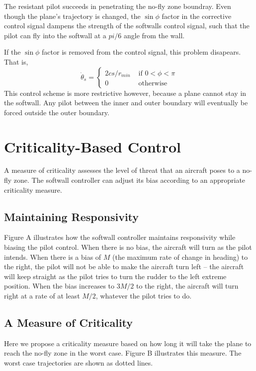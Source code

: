 \documentclass[11pt]{article}
\begin{document}
The resistant pilot succeeds in penetrating the no-fly zone boundray.  Even though the plane's trajectory is changed, the $\sin{\phi}$ factor in the corrective control signal dampens the strength of the softwalls control signal, such that the pilot can fly into the softwall at a  $pi/6$ angle from the wall.

If the $\sin{\phi}$ factor is removed from the control signal, this problem disapears.  That is,
\[
\dot{\theta}_s = \left \{
\begin{array}{ll}
2 c s/r_{min}& \mbox{ if } 0 < \phi < \pi\\
0 & \mbox{ otherwise}
\end{array}
\right .
\]
This control scheme is more restrictive however, because a plane cannot stay in the softwall.  Any pilot between the inner and outer boundary will eventually be forced outside the outer boundary.

\section{Criticality-Based Control}

A measure of criticality assesses the level of threat that an aircraft poses to
a no-fly zone. The softwall controller can adjust its bias according to an
appropriate criticality measure.

\subsection{Maintaining Responsivity}

Figure A illustrates how the softwall controller maintains responsivity while
biasing the pilot control. When there is no bias, the aircraft will turn as the
pilot intends. When there is a bias of $M$ (the maximum rate of change in
heading) to the right, the pilot will not be able to make the aircraft turn 
left -- the aircraft will keep straight as the pilot tries to turn the rudder
to the left extreme position. 
When the bias increases to $3M/2$ to the right, the aircraft will turn right at
a rate of at least $M/2$, whatever the pilot tries to do.

\subsection{A Measure of Criticality}

Here we propose a criticality measure based on how long it will take the plane
to reach the no-fly zone in the worst case. Figure B illustrates this measure.
The worst case trajectories are shown as dotted lines.
\end{document}
